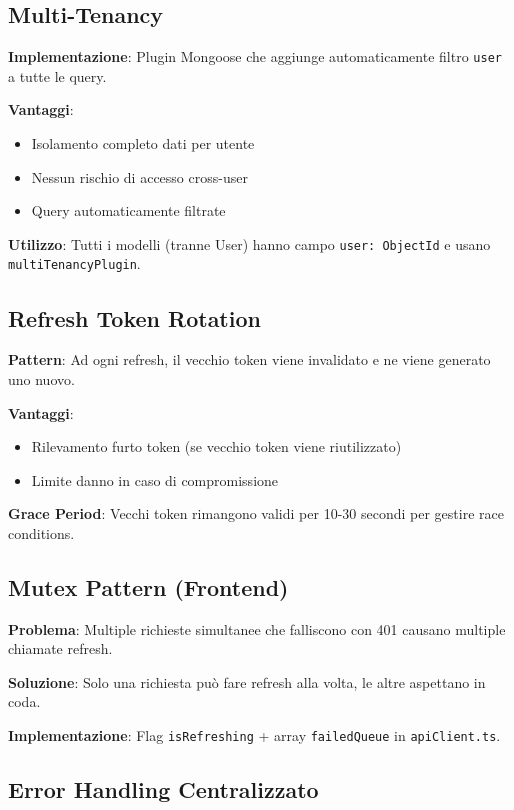 \documentclass[11pt,a4paper]{article}
\begin{document}
\subsection{Multi-Tenancy}

\textbf{Implementazione}: Plugin Mongoose che aggiunge automaticamente filtro \texttt{user} a tutte le query.

\textbf{Vantaggi}:
\begin{itemize}
    \item Isolamento completo dati per utente
    \item Nessun rischio di accesso cross-user
    \item Query automaticamente filtrate
\end{itemize}

\textbf{Utilizzo}: Tutti i modelli (tranne User) hanno campo \texttt{user: ObjectId} e usano \texttt{multiTenancyPlugin}.

\subsection{Refresh Token Rotation}

\textbf{Pattern}: Ad ogni refresh, il vecchio token viene invalidato e ne viene generato uno nuovo.

\textbf{Vantaggi}:
\begin{itemize}
    \item Rilevamento furto token (se vecchio token viene riutilizzato)
    \item Limite danno in caso di compromissione
\end{itemize}

\textbf{Grace Period}: Vecchi token rimangono validi per 10-30 secondi per gestire race conditions.

\subsection{Mutex Pattern (Frontend)}

\textbf{Problema}: Multiple richieste simultanee che falliscono con 401 causano multiple chiamate refresh.

\textbf{Soluzione}: Solo una richiesta può fare refresh alla volta, le altre aspettano in coda.

\textbf{Implementazione}: Flag \texttt{isRefreshing} + array \texttt{failedQueue} in \texttt{apiClient.ts}.

\subsection{Error Handling Centralizzato}
\end{document}
